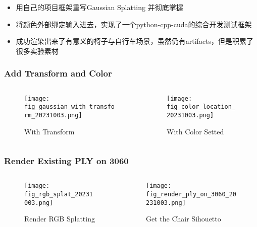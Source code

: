 \begin{frame}
    \begin{itemize}
        \item 用自己的项目框架重写Gaussian Splatting \cite{kerbl3DGaussianSplatting2023} 并彻底掌握
        \item 将颜色外部绑定输入进去，实现了一个python-cpp-cuda的综合开发测试框架
        \item 成功渲染出来了有意义的椅子与自行车场景，虽然仍有artifacts，但是积累了很多实验素材
    \end{itemize}
    \end{frame}
    
    \begin{frame}
        \frametitle{Add Transform and Color }
        \begin{columns}[c]
            \begin{column}{0.5\textwidth}
                \begin{figure}
                    \texttt{[image: fig\_gaussian\_with\_transform\_20231003.png]}
                    \caption{With Transform}
                \end{figure}
            \end{column}
            \begin{column}{0.5\textwidth}
                \begin{figure}
                    \texttt{[image: fig\_color\_location\_20231003.png]}
                    \caption{With Color Setted }
                \end{figure}
            \end{column}
        \end{columns}
    \end{frame}
    
    \begin{frame}
        \frametitle{Render Existing PLY on 3060}
        \begin{columns}[c]
            \begin{column}{0.5\textwidth}
                \begin{figure}
                    \texttt{[image: fig\_rgb\_splat\_20231003.png]}
                    \caption{Render RGB Splatting}
                \end{figure}
            \end{column}
            \begin{column}{0.5\textwidth}
                \begin{figure}
                    \texttt{[image: fig\_render\_ply\_on\_3060\_20231003.png]}
                    \caption{Get the Chair Sihouetto }
                \end{figure}
            \end{column}
        \end{columns}
    \end{frame}
    
